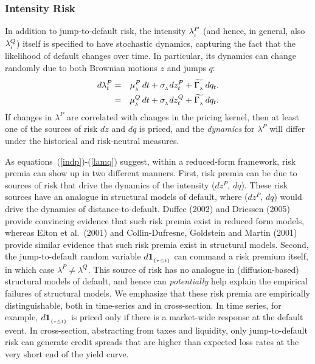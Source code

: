 \documentclass[titlepage,11pt]{article}
\def\by{\begin{eqnarray}}
\def\ey{\end{eqnarray}}
\begin{document}
\subsubsection{Intensity Risk}
In addition to jump-to-default risk,
the intensity $\lambda^{P}_{_{{t}}}$ (and hence, in general,  also $\lambda^{Q}_{_{{t}}}$) itself is specified
to have stochastic dynamics, capturing the fact that the likelihood of default changes over
time. In particular, its dynamics can change randomly due to both Brownian motions $z$
and jumps $q$:
\by\label{lam_p_12}
d\lambda^{P}_t &=& \mu^{P}\sub{\lambda} \, dt + \sigma\sub{\lambda}
dz^{P}_t + \widetilde{\Gamma\sub{\lambda}} \, dq_t. \nonumber\\ \label{lamq}
%
&=& \mu^{Q}\sub{\lambda} \, dt + \sigma\sub{\lambda} dz^{Q}_{t} +
\widetilde{\Gamma\sub{\lambda}} \, dq_{t}.\label{lam_q_12}
\ey
If changes in $\lambda^{P}$ are correlated with
changes in the pricing kernel, then at least one of the sources of risk $dz$ and $dq$ is priced, and
the {\sl dynamics} for $\lambda^{P}$ will differ under the historical and risk-neutral
measures.

As equations~(\ref{indp})-(\ref{lamq}) suggest, within a reduced-form framework, risk
premia can show up in two different manners.  First, risk premia can be due to sources
of risk that drive the dynamics of the intensity ($dz^{P}$, $dq$).
These risk sources have an analogue in structural models of default, where
($dz^{P}$, $dq$) would drive the dynamics of distance-to-default.
Duffee (2002) and Driessen (2005) provide convincing evidence that such
risk premia exist in reduced form models, whereas
Elton et al.\ (2001) and Collin-Dufresne, Goldstein and Martin (2001)
provide similar evidence that such risk premia exist in structural models.
Second, the jump-to-default random variable $d{\bf 1}_{_{{\left\{{\tau\leq t}\right\}}}}$ can command a risk premium itself,
in which case $\lambda^{P} \neq \lambda^{Q}$.  This source of risk has no analogue in
(diffusion-based) structural models of default, and hence can {\em potentially} help explain
the empirical failures of structural models.
We emphasize that these risk premia are empirically distinguishable, both in time-series and
in cross-section.  In time series,
for example, $d{\bf 1}_{_{{\left\{{\tau\leq t}\right\}}}}$ is priced only if there is a market-wide response at
the default event. In cross-section, abstracting from taxes and liquidity, only jump-to-default
risk can generate credit spreads that are higher than expected loss rates at the very
short end of the yield curve.
\end{document}
